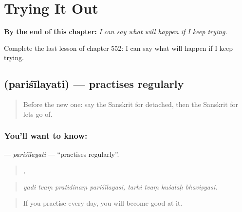 
\chapter{Trying It Out}
\label{ch:sa-trying-it-out}

\begin{chapteropening}
\textbf{By the end of this chapter:} \emph{I can say what will happen if I keep trying.}

Complete the last lesson of chapter 552: I can say what will happen if I keep trying.
\end{chapteropening}

\section[\texorpdfstring{\sk{परिशीलयति} (pariśīlayati)}{परिशीलयति (pariśīlayati)}]{ (pariśīlayati) — practises regularly}

\label{lesson:SA-C552-parisilayati}



\begin{quote}
Before the new one: say the Sanskrit for detached, then the Sanskrit for lets go of.
\end{quote}

\subsection*{You'll want to know: }
\textbf{} — \emph{pariśīlayati} — \textquotedblleft{}practises regularly\textquotedblright{}.

\begin{quote}
   ,    
\end{quote}

\begin{quote}
\emph{yadi tvaṃ pratidinaṃ pariśīlayasi, tarhi tvaṃ kuśalaḥ bhaviṣyasi.}
\end{quote}

\begin{quote}
If you practise every day, you will become good at it.
\end{quote}

